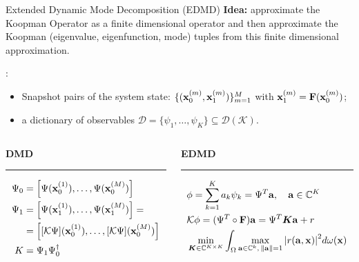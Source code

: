 \documentclass{beamer}
\begin{document}
\begin{frame}{Extended Dynamic Mode Decomposition (EDMD)}
\alert{\textbf{Idea:}} approximate the Koopman Operator as a finite dimensional operator and then approximate the Koopman (eigenvalue, eigenfunction, mode) tuples from this finite dimensional approximation. 

\medskip
{}:
\begin{itemize}
    \item Snapshot pairs of the system state: $\{(\vb{x}_0^{(m)}, \vb{x}_1^{(m)})\}_{m = 1}^M$ with $\vb{x}_1^{(m)} = \vb{F}(\vb{x}_0^{(m)})$;
    \item a dictionary of observables $\mathcal{D} = \{\psi_1, \dots, \psi_K\} \subseteq \mathcal{D}(\mathcal{K})$.
\end{itemize}
\begin{columns}[T] %
\begin{column}{.48\textwidth}
{\textbf{DMD}\\\vspace{-6pt}\rule{\linewidth}{2pt}}
{\footnotesize
\begin{equation*}
    \begin{split}
        \Psi_0 &= \left[\Psi(\vb{x}_0^{(1)}), \dots, \Psi(\vb{x}_0^{(M)})\right]\\
        \Psi_1 &= \left[\Psi(\vb{x}_1^{(1)}), \dots, \Psi(\vb{x}_1^{(M)})\right] = \\
        & = \left[[\mathcal{K}\Psi](\vb{x}_0^{(1)}), \dots, [\mathcal{K}\Psi](\vb{x}_0^{(M)})\right] \\
        K &= \Psi_1\Psi_0^{\dagger}
    \end{split}
\end{equation*}}
\end{column}%
\hfill%
\begin{column}{.48\textwidth}
{\textbf{EDMD}\\\vspace{-6pt}\rule{\linewidth}{2pt}}
{\footnotesize
\begin{equation*}
    \begin{split}
        &\phi = \sum_{k=1}^K a_k\psi_k = \Psi^T\vb{a}, \quad \vb{a}\in\mathbb{C}^K \\
        &\mathcal{K}\vb{\phi} = (\Psi^T \circ \vb{F})\vb{a} = \Psi^T\vb*K\vb{a} + r\\
        &\min_{\vb*{K}\in\mathbb{C}^{K\times K}}\int_{\Omega} \max_{\vb{a}\in\mathbb{C}^k,\,\norm{\vb{a}} = 1}\abs{r(\vb{a}, \vb{x})}^2 d\omega(\vb{x})
    \end{split}
\end{equation*}}
\end{column}%
\end{columns}
\end{frame}
\end{document}
